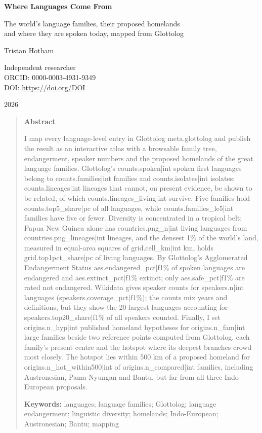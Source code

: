 \documentclass[11pt,a4paper]{article}
\begin{document}
\begin{center}
{\Large\bfseries Where Languages Come From\par}
\vspace{0.4em}
{\large The world's language families, their proposed homelands\\and where they are spoken today, mapped from Glottolog\par}
\vspace{1.2em}
{\large Tristan Hotham\par}
\vspace{0.3em}
{\small Independent researcher\\
ORCID: 0000-0003-4931-9349\\
DOI: \href{https://doi.org/{{DOI}}}{https://doi.org/{{DOI}}}\par}
\vspace{0.8em}
2026
\end{center}

\begin{quote}
\small
\begin{center}\textbf{Abstract}\end{center}
I map every language-level entry in Glottolog {{meta.glottolog}} and publish the result as an interactive atlas with a browsable family tree, endangerment, speaker numbers and the proposed homelands of the great language families. Glottolog's {{counts.spoken|int}} spoken first languages belong to {{counts.families|int}} families and {{counts.isolates|int}} isolates: {{counts.lineages|int}} lineages that cannot, on present evidence, be shown to be related, of which {{counts.lineages_living|int}} survive. Five families hold {{counts.top5_share|pc}} of all languages, while {{counts.families_le5|int}} families have five or fewer. Diversity is concentrated in a tropical belt: Papua New Guinea alone has {{countries.png_n|int}} living languages from {{countries.png_lineages|int}} lineages, and the densest 1\% of the world's land, measured in equal-area squares of {{grid.cell_km|int}} km, holds {{grid.top1pct_share|pc}} of living languages. By Glottolog's Agglomerated Endangerment Status {{aes.endangered_pct|f1}}\% of spoken languages are endangered and {{aes.extinct_pct|f1}}\% extinct; only {{aes.safe_pct|f1}}\% are rated not endangered. Wikidata gives speaker counts for {{speakers.n|int}} languages ({{speakers.coverage_pct|f1}}\%); the counts mix years and definitions, but they show the 20 largest languages accounting for {{speakers.top20_share|f1}}\% of all speakers counted. Finally, I set {{origins.n_hyp|int}} published homeland hypotheses for {{origins.n_fam|int}} large families beside two reference points computed from Glottolog, each family's present centre and the hotspot where its deepest branches crowd most closely. The hotspot lies within 500 km of a proposed homeland for {{origins.n_hot_within500|int}} of {{origins.n_compared|int}} families, including Austronesian, Pama-Nyungan and Bantu, but far from all three Indo-European proposals.

\textbf{Keywords:} languages; language families; Glottolog; language endangerment; linguistic diversity; homelands; Indo-European; Austronesian; Bantu; mapping
\end{quote}
\end{document}
